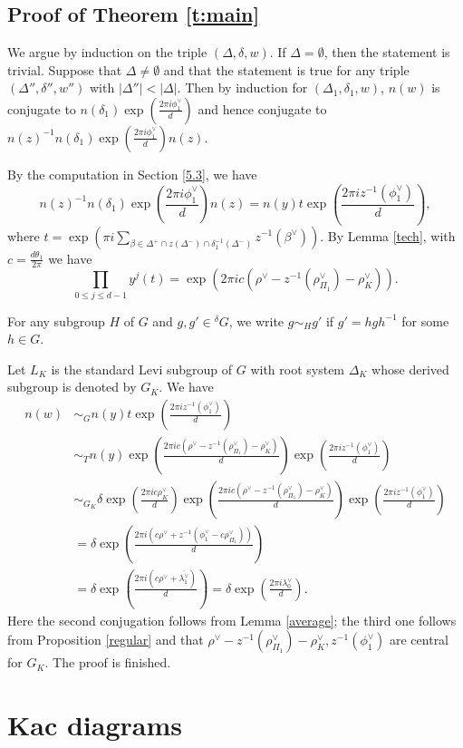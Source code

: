 \documentclass[10pt,leqno]{article}
\renewcommand{\sec}[1]{\section{#1}
\renewcommand{\theequation}{\thesection.\arabic{equation}}
  \setcounter{equation}{0}}
\def\le{\leqslant}
\def\b{\beta}
\def\d{\delta}
\def\l{\lambda}
\def\i{^{-1}}
\renewcommand{\sec}[1]{\section{#1}
\renewcommand{\theequation}{\thesection.\arabic{equation}}
  \setcounter{equation}{0}}
\begin{document}
\subsection{Proof of Theorem \ref{t:main}}
We argue by induction on the triple $(\Delta, \d, w)$. If $\Delta=\emptyset$, then the statement is trivial. Suppose that $\Delta \neq \emptyset$ and that the statement is true for any triple $(\Delta'', \d'', w'')$ with $|\Delta''|<|\Delta|$. Then by induction for $(\Delta_1, \d_1, w)$, $n(w)$ is conjugate to $n(\d_1) \exp(\frac{2 \pi i \phi_1^\vee}{d})$ and hence conjugate to $n(z)^{-1} n(\d_1) \exp(\frac{2 \pi i \phi_1^\vee}{d}) n(z)$.

By the computation in Section \ref{5.3}, we have $$n(z)^{-1} n(\d_1) \exp(\frac{2 \pi i \phi_1^\vee}{d}) n(z)=n(y) t \exp(\frac{2 \pi i z^{-1}(\phi_1^\vee)}{d}),$$ where
$t=\exp (\pi i\sum_{\b \in \Delta^+ \cap z(\Delta^-) \cap \d_1 \i(\Delta^-)} z^{-1}(\b^\vee))$.
By Lemma \ref{tech}, with $c=\frac{d\theta_1}{2\pi}$ we have
$$
\prod_{0 \le j \le d-1} y^j(t)=\exp(2\pi i c (\rho^\vee-z^{-1}(\rho_{\Pi_1}^\vee)-\rho_K^\vee)).
$$

For any subgroup $H$ of $G$ and $g, g' \in {}^\d G$, we write $g \sim_H g'$ if $g'=h g h \i$ for some $h \in G$.

Let $L_K$ is the standard Levi subgroup of $G$ with root system $\Delta_K$ whose derived subgroup is denoted by $G_K$. We have
\begin{align*}
  n(w) &\sim_G  n(y) t \exp(\frac{2 \pi i z^{-1}(\phi_1^\vee)}{d}) \\
       & \sim_T n(y) \exp(\frac{2\pi i c (\rho^\vee-z^{-1}(\rho_{\Pi_1}^\vee)-\rho_K^\vee)}{d}) \exp(\frac{2 \pi i z^{-1}(\phi_1^\vee)}{d}) \\
       & \sim_{G_K} \d \exp(\frac{2 \pi i c \rho_K^\vee}{d}) \exp(\frac{2\pi i c (\rho^\vee-z^{-1}(\rho_{\Pi_1}^\vee)-\rho_K^\vee)}{d}) \exp(\frac{2 \pi i z^{-1}(\phi_1^\vee)}{d}) \\
       &=\d \exp(\frac{2\pi i (c\rho^\vee + z^{-1}(\phi_1^\vee - c\rho_{\Pi_1}^\vee))}{d}) \\
       &=\d \exp(\frac{2\pi i (c\rho^\vee + \overline{\l_1^\vee})}{d})
        =\d \exp(\frac{2 \pi i \l_0^\vee}{d}).
\end{align*}
Here the second conjugation follows from Lemma \ref{average}; the third one follows from Proposition \ref{regular} and that $\rho^\vee-z^{-1}(\rho_{\Pi_1}^\vee)-\rho_K^\vee, z^{-1}(\phi_1^\vee)$ are central for $G_K$. The proof is finished.

\sec{Kac diagrams}
\label{s:kac}
\end{document}
